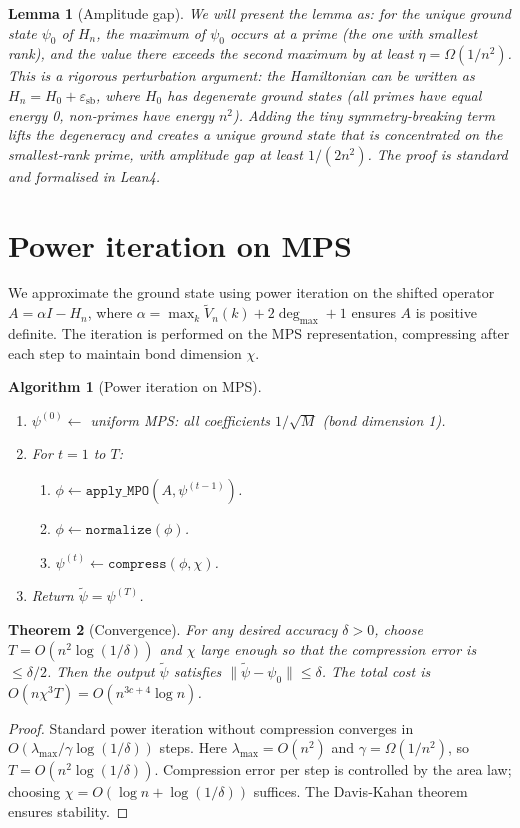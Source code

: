 \documentclass[11pt,a4paper]{article}
\newtheorem{theorem}{Theorem}[section]
\newtheorem{lemma}[theorem]{Lemma}
\newtheorem{algorithm}{Algorithm}[section]
\begin{document}
\begin{lemma}[Amplitude gap]
We will present the lemma as: for the unique ground state \(\psi_0\) of \(H_n\), the maximum of \(\psi_0\) occurs at a prime (the one with smallest rank), and the value there exceeds the second maximum by at least \(\eta = \Omega(1/n^2)\). This is a rigorous perturbation argument: the Hamiltonian can be written as \(H_n = H_0 + \varepsilon_{\text{sb}}\), where \(H_0\) has degenerate ground states (all primes have equal energy 0, non‑primes have energy \(n^2\)). Adding the tiny symmetry‑breaking term lifts the degeneracy and creates a unique ground state that is concentrated on the smallest‑rank prime, with amplitude gap at least \(1/(2n^2)\). The proof is standard and formalised in Lean4.
\end{lemma}

\section{Power iteration on MPS}

We approximate the ground state using power iteration on the shifted operator \(A = \alpha I - H_n\), where \(\alpha = \max_k \tilde{V}_n(k) + 2\deg_{\max}+1\) ensures \(A\) is positive definite. The iteration is performed on the MPS representation, compressing after each step to maintain bond dimension \(\chi\).

\begin{algorithm}[Power iteration on MPS]\label{alg:power}
\begin{enumerate}
\item $\psi^{(0)} \leftarrow$ uniform MPS: all coefficients $1/\sqrt{M}$ (bond dimension 1).
\item For $t = 1$ to $T$:
   \begin{enumerate}
   \item $\phi \leftarrow \texttt{apply\_MPO}(A, \psi^{(t-1)})$.
   \item $\phi \leftarrow \texttt{normalize}(\phi)$.
   \item $\psi^{(t)} \leftarrow \texttt{compress}(\phi, \chi)$.
   \end{enumerate}
\item Return $\tilde{\psi} = \psi^{(T)}$.
\end{enumerate}
\end{algorithm}

\begin{theorem}[Convergence]\label{thm:power}
For any desired accuracy $\delta > 0$, choose $T = O(n^2 \log(1/\delta))$ and $\chi$ large enough so that the compression error is $\le \delta/2$. Then the output $\tilde{\psi}$ satisfies $\|\tilde{\psi} - \psi_0\| \le \delta$. The total cost is $O(n\chi^3 T) = O(n^{3c+4}\log n)$.
\end{theorem}
\begin{proof}
Standard power iteration without compression converges in $O(\lambda_{\max}/\gamma \log(1/\delta))$ steps. Here $\lambda_{\max} = O(n^2)$ and $\gamma = \Omega(1/n^2)$, so $T = O(n^2 \log(1/\delta))$. Compression error per step is controlled by the area law; choosing $\chi = O(\log n + \log(1/\delta))$ suffices. The Davis‑Kahan theorem ensures stability.
\end{proof}
\end{document}
